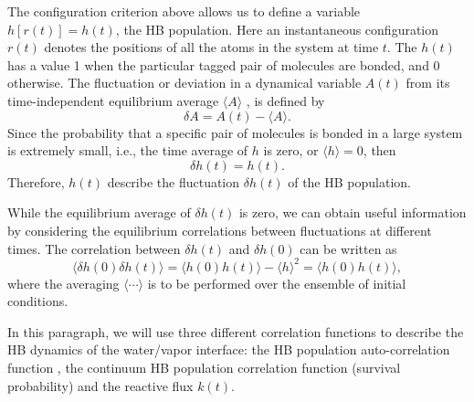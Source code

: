 The configuration criterion above allows us to define a variable $h[r(t)] = h(t)$, the HB population. 
Here an instantaneous configuration $r(t)$ denotes the positions of all the atoms in the system at time $t$.\cite{AL96}  
The $h(t)$ has a value 1 when the particular tagged pair of molecules are bonded, and 0 otherwise. 
The fluctuation or deviation in a dynamical variable $A(t)$ from its time-independent equilibrium average $\langle A\rangle$ , 
is defined by \cite{DC87} 
$$
\delta A = A(t) - \langle A\rangle.
$$
Since the probability that a specific pair of molecules is bonded in a large system is extremely small, i.e., 
the time average of $h$ is zero, or  
$\langle h \rangle = 0$,
then
$$
\delta h(t) = h(t).
$$
Therefore, $h(t)$ describe the fluctuation $\delta h(t)$  of the HB population.  

While the equilibrium average of $\delta h(t)$ is zero, we can obtain useful information by considering the equilibrium 
correlations between fluctuations at different times. The correlation between $\delta h(t)$ and $\delta h(0)$ can be written as 
$$
\langle \delta h(0) \delta h(t)\rangle = \langle h(0)h(t)\rangle-\langle h \rangle^2 = \langle h(0)h(t)\rangle,
$$
where the averaging $\langle\cdots\rangle$ is to be performed over the ensemble of initial conditions.%


In this paragraph, we will use three different correlation functions to describe the HB dynamics of the water/vapor interface:
the HB population auto-correlation function \CHB, the continuum HB population correlation function (survival probability) \SHB and the reactive flux $k(t)$. \cite{Rapaport1983}

\FloatBarrier
